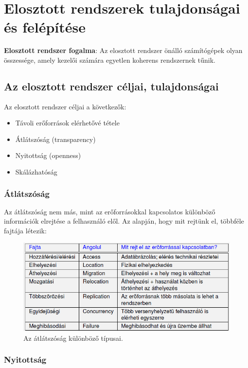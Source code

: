\documentclass[margin=0px]{article}
\begin{document}
\section{Elosztott rendszerek tulajdonságai és felépítése}

\noindent \textbf{Elosztott rendszer fogalma}: Az elosztott rendszer önálló számítógépek olyan összessége, amely kezelői számára
egyetlen koherens rendszernek tűnik.

\subsection{Az elosztott rendszer céljai, tulajdonságai}

Az elosztott rendszer céljai a következők:

\begin{itemize}
    \item	Távoli erőforrások elérhetővé tétele

    \item	Átlátszóság (transparency)

    \item	Nyitottság (openness)

    \item	Skálázhatóság
\end{itemize}

\subsubsection{Átlátszóság}

Az átlátszóság nem más, mint az erőforrásokkal kapcsolatos különböző információk elrejtése a felhasználó elől.
Az alapján, hogy mit rejtünk el, többféle fajtája létezik:

\begin{figure}[H]
    \centering
    \includegraphics[width=0.8\linewidth]{img/atlatszosag}
    \caption{Az átlátszóság különböző típusai.}
    \label{fig:atlatszosag}
\end{figure}

\subsubsection{Nyitottság}
\end{document}
